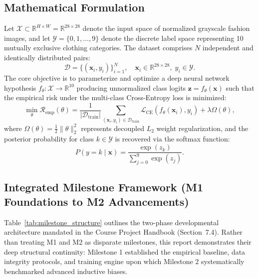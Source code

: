 \documentclass[11pt, a4paper]{article}
\begin{document}
\subsection{Mathematical Formulation}
Let $\mathcal{X} \subset \mathbb{R}^{H \times W} = \mathbb{R}^{28 \times 28}$ denote the input space of normalized grayscale fashion images, and let $\mathcal{Y} = \{0, 1, \ldots, 9\}$ denote the discrete label space representing 10 mutually exclusive clothing categories. The dataset comprises $N$ independent and identically distributed pairs:
\begin{equation}
  \mathcal{D} = \{(\mathbf{x}_i, y_i)\}_{i=1}^N, \quad \mathbf{x}_i \in \mathbb{R}^{28 \times 28}, \; y_i \in \mathcal{Y}.
\end{equation}
The core objective is to parameterize and optimize a deep neural network hypothesis $f_\theta: \mathcal{X} \to \mathbb{R}^{10}$ producing unnormalized class logits $\mathbf{z} = f_\theta(\mathbf{x})$ such that the empirical risk under the multi-class Cross-Entropy loss is minimized:
\begin{equation}
  \min_{\theta} \mathcal{R}_{\text{emp}}(\theta) = \frac{1}{|\mathcal{D}_{\text{train}}|} \sum_{(\mathbf{x}_i, y_i) \in \mathcal{D}_{\text{train}}} \mathcal{L}_{\text{CE}}(f_\theta(\mathbf{x}_i), y_i) + \lambda \Omega(\theta),
\end{equation}
where $\Omega(\theta) = \frac{1}{2}\|\theta\|_2^2$ represents decoupled $L_2$ weight regularization, and the posterior probability for class $k \in \mathcal{Y}$ is recovered via the softmax function:
\begin{equation}
  P(y = k \mid \mathbf{x}) = \frac{\exp(z_k)}{\sum_{j=0}^9 \exp(z_j)}.
\end{equation}

\subsection{Integrated Milestone Framework (M1 Foundations to M2 Advancements)}
Table~\ref{tab:milestone_structure} outlines the two-phase developmental architecture mandated in the Course Project Handbook (Section~7.4). Rather than treating M1 and M2 as disparate milestones, this report demonstrates their deep structural continuity: Milestone 1 established the empirical baseline, data integrity protocols, and training engine upon which Milestone 2 systematically benchmarked advanced inductive biases.
\end{document}
